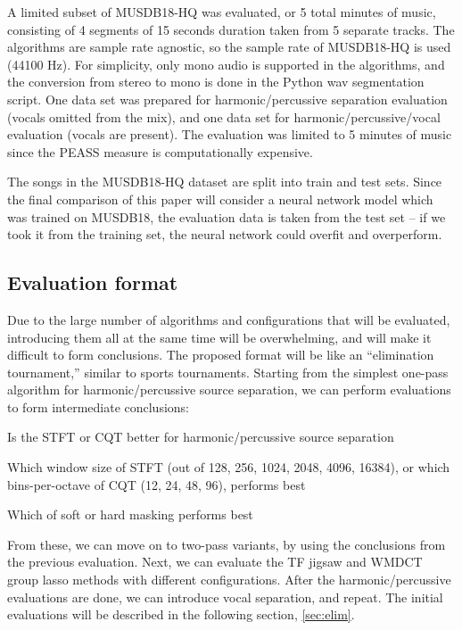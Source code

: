 \documentclass[letter,12pt]{article}
\newenvironment{tight_itemize}{
\begin{itemize}
  \setlength{\itemsep}{0pt}
  \setlength{\parskip}{0pt}
}{\end{itemize}}
\begin{document}
A limited subset of MUSDB18-HQ was evaluated, or 5 total minutes of music, consisting of 4 segments of 15 seconds duration taken from 5 separate tracks. The algorithms are sample rate agnostic, so the sample rate of MUSDB18-HQ is used (44100 Hz). For simplicity, only mono audio is supported in the algorithms, and the conversion from stereo to mono is done in the Python wav segmentation script. One data set was prepared for harmonic/percussive separation evaluation (vocals omitted from the mix), and one data set for harmonic/percussive/vocal evaluation (vocals are present). The evaluation was limited to 5 minutes of music since the PEASS measure is computationally expensive.

The songs in the MUSDB18-HQ dataset are split into train and test sets. Since the final comparison of this paper will consider a neural network model which was trained on MUSDB18, the evaluation data is taken from the test set -- if we took it from the training set, the neural network could overfit and overperform.

\subsection{Evaluation format}

Due to the large number of algorithms and configurations that will be evaluated, introducing them all at the same time will be overwhelming, and will make it difficult to form conclusions. The proposed format will be like an ``elimination tournament,'' similar to sports tournaments. Starting from the simplest one-pass algorithm for harmonic/percussive source separation, we can perform evaluations to form intermediate conclusions:

\begin{tight_itemize}
\item
	Is the STFT or CQT better for harmonic/percussive source separation
\item
	Which window size of STFT (out of 128, 256, 1024, 2048, 4096, 16384), or which bins-per-octave of CQT (12, 24, 48, 96), performs best
\item
	Which of soft or hard masking performs best
\end{tight_itemize} 

From these, we can move on to two-pass variants, by using the conclusions from the previous evaluation. Next, we can evaluate the TF jigsaw and WMDCT group lasso methods with different configurations. After the harmonic/percussive evaluations are done, we can introduce vocal separation, and repeat. The initial evaluations will be described in the following section, \ref{sec:elim}.
\end{document}
